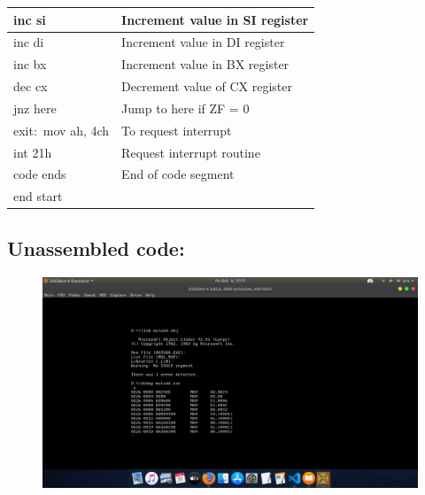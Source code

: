 \documentclass[10pt,a4paper]{article}
\begin{document}
\begin{flushleft}
\begin{table}[htb]
{\begin{tabular}{|l|l|}
\hline
inc si                                                           & Increment value in SI register                \\
\hline 
inc di                                                           & Increment value in DI register                \\
\hline
inc bx                                                           & Increment value in BX register                \\         
\hline
dec cx                                                           & Decrement value of CX register                \\
\hline
jnz here                                                         & Jump to here if ZF = 0                        \\
\hline
exit:~mov ah, 4ch                                                & To request interrupt                          \\
\hline
int 21h                                                          & Request interrupt routine                     \\ 
\hline
code ends                                                        & End of code segment                           \\
\hline
end start                                                        &                                               \\
\hline
\end{tabular}
}
\end{table}

\newpage
\subsection*{\textbf{Unassembled code:}}
\begin{figure}[h]
    \centering
    \includegraphics[trim = 100mm 60mm 200mm 120mm, clip, width = \textwidth]{Pics/MAUS.png}
\end{figure}

\end{flushleft}
\end{document}
